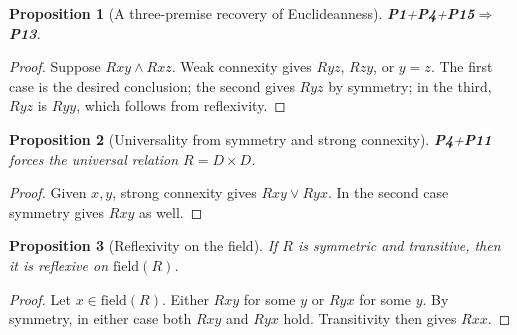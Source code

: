 \documentclass[11pt,a4paper,reqno]{amsart}
\newtheorem{proposition}{Proposition}[section]
\theoremstyle{definition}
\theoremstyle{remark}
\newcommand{\field}{\mathrm{field}}
\newcommand{\prop}[1]{\textbf{P#1}}
\newcommand{\catentails}{\Rightarrow}
\begin{document}
\begin{proposition}[A three-premise recovery of Euclideanness]\label{prop:p1p4p15}
\prop{1}+\prop{4}+\prop{15}$\catentails$\prop{13}.
\end{proposition}
\begin{proof}
Suppose $Rxy\wedge Rxz$.  Weak connexity gives $Ryz$, $Rzy$, or $y=z$.
The first case is the desired conclusion; the second gives $Ryz$ by symmetry;
in the third, $Ryz$ is $Ryy$, which follows from reflexivity.
\end{proof}

\begin{proposition}[Universality from symmetry and strong connexity]\label{prop:complete}
\prop{4}+\prop{11} forces the universal relation $R=D\times D$.
\end{proposition}
\begin{proof}
Given $x,y$, strong connexity gives $Rxy\vee Ryx$.  In the second case symmetry
gives $Rxy$ as well.
\end{proof}

\begin{proposition}[Reflexivity on the field]\label{prop:fieldrefl}
If $R$ is symmetric and transitive, then it is reflexive on $\field(R)$.
\end{proposition}
\begin{proof}
Let $x\in\field(R)$.  Either $Rxy$ for some $y$ or $Ryx$ for some $y$.  By
symmetry, in either case both $Rxy$ and $Ryx$ hold.  Transitivity then gives
$Rxx$.
\end{proof}
\end{document}
